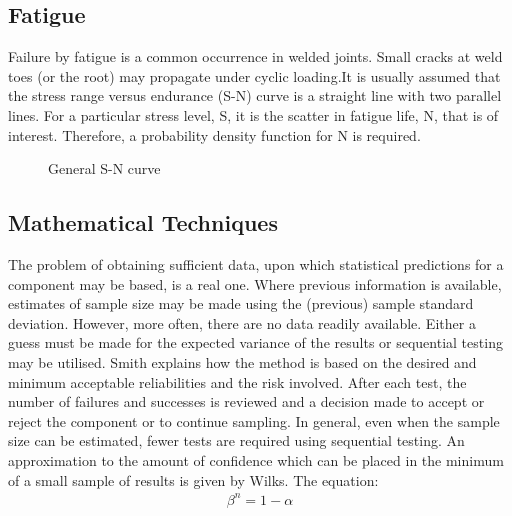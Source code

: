 \documentclass[12pt]{article}
\begin{document}
\subsection{Fatigue}
Failure by fatigue is a common occurrence in welded joints. Small cracks at weld
toes (or the root) may propagate under cyclic loading.It is usually assumed that the stress range versus endurance (S-N) curve is a
straight line with two parallel lines. For a particular stress level, S, it is the
scatter in fatigue life, N, that is of interest. Therefore, a probability density function
for N is required.
\begin{figure}[H]
    \centering
    \captionsetup{labelformat=empty}
    \caption{General S-N curve}  
\end{figure}
\subsection{Mathematical Techniques}

The problem of obtaining sufficient data, upon which statistical predictions for a
component may be based, is a real one. Where previous information is available,
estimates of sample size may be made using the (previous) sample standard
deviation. However, more often, there are no data readily
available. Either a guess must be made for the expected variance of the results or
sequential testing may be utilised. Smith explains how the method is based on the
desired and minimum acceptable reliabilities and the risk involved. After each test,
the number of failures and successes is reviewed and a decision made to accept or
reject the component or to continue sampling. In general, even when the sample size
can be estimated, fewer tests are required using sequential testing.
An approximation to the amount of confidence which can be placed in the
minimum of a small sample of results is given by Wilks. The equation:
\begin{align*}
    \beta^n = 1 - \alpha
\end{align*}
\end{document}
